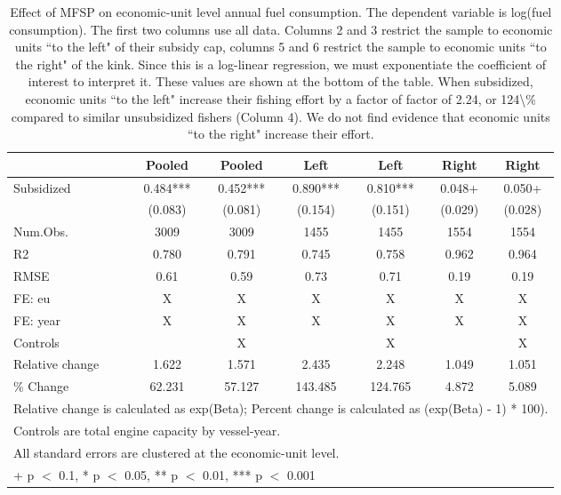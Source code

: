 \begin{table}

\caption{\label{tab:}Effect of MFSP on economic-unit level annual fuel consumption.
  The dependent variable is log(fuel consumption). The first two columns use all
  data. Columns 2 and 3 restrict the sample to economic units ``to the left" of
  their subsidy cap, columns 5 and 6 restrict the sample to economic units
  ``to the right" of the kink. Since this is a log-linear regression, we must
  exponentiate the coefficient of interest to interpret it. These values are
  shown at the bottom of the table. When subsidized, economic units ``to the
  left" increase their fishing effort by a factor of factor of 2.24, or 124\textbackslash{}\%
  compared to similar unsubsidized fishers (Column 4). We do not find evidence
  that economic units ``to the right" increase their effort.}
\centering
\begin{tabular}[t]{lcccccc}
\toprule
  & Pooled & Pooled  & Left & Left  & Right & Right \\
\midrule
Subsidized & \num{0.484}*** & \num{0.452}*** & \num{0.890}*** & \num{0.810}*** & \num{0.048}+ & \num{0.050}+\\
 & (\num{0.083}) & (\num{0.081}) & (\num{0.154}) & (\num{0.151}) & (\num{0.029}) & (\num{0.028})\\
\midrule
Num.Obs. & \num{3009} & \num{3009} & \num{1455} & \num{1455} & \num{1554} & \num{1554}\\
R2 & \num{0.780} & \num{0.791} & \num{0.745} & \num{0.758} & \num{0.962} & \num{0.964}\\
RMSE & \num{0.61} & \num{0.59} & \num{0.73} & \num{0.71} & \num{0.19} & \num{0.19}\\
FE: eu & X & X & X & X & X & X\\
FE: year & X & X & X & X & X & X\\
Controls &  & X &  & X &  & X\\
Relative change & 1.622 & 1.571 & 2.435 & 2.248 & 1.049 & 1.051\\
\% Change & 62.231 & 57.127 & 143.485 & 124.765 & 4.872 & 5.089\\
\bottomrule
\multicolumn{7}{l}{\rule{0pt}{1em}Relative change is calculated as exp(Beta); Percent change is
               calculated as (exp(Beta) - 1) * 100).}\\
\multicolumn{7}{l}{\rule{0pt}{1em}Controls are total engine capacity by vessel-year.}\\
\multicolumn{7}{l}{\rule{0pt}{1em}All standard errors are clustered at the economic-unit level.}\\
\multicolumn{7}{l}{\rule{0pt}{1em}+ p $<$ 0.1, * p $<$ 0.05, ** p $<$ 0.01, *** p $<$ 0.001}\\
\end{tabular}
\end{table}
